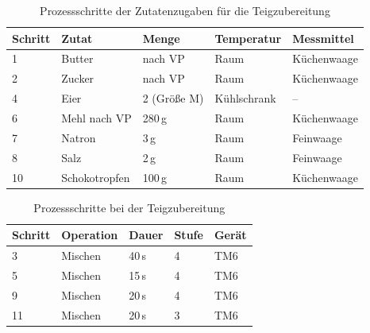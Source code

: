 \begin{table}
\centering
\caption{Prozessschritte der Zutatenzugaben für die Teigzubereitung}
\label{table:zubereitung_zugaben}
\begin{tabular}{|l|l|l|l|l|}
\hline
Schritt & Zutat               & Menge    & Temperatur  & Messmittel \\
\hline
1       & Butter              & nach VP     & Raum        & Küchenwaage \\
2       & Zucker              & nach VP     & Raum        & Küchenwaage \\
\hline
4       & Eier                & 2 (Größe M) & Kühlschrank & -- \\
\hline
6       & Mehl nach VP        & 280\,g      & Raum        & Küchenwaage \\
7       & Natron              & 3\,g        & Raum        & Feinwaage \\
8       & Salz                & 2\,g        & Raum        & Feinwaage \\
\hline
10      & Schokotropfen       & 100\,g      & Raum        & Küchenwaage \\
\hline
\end{tabular}
\end{table}

\begin{table}
\centering
\caption{Prozessschritte bei der Teigzubereitung}
\label{table:zubereitung_prozess}
\begin{tabular}{|l|l|l|l|l|}
\hline
Schritt & Operation & Dauer & Stufe & Gerät \\
\hline
3       & Mischen   & 40\,s & 4     & TM6 \\
5       & Mischen   & 15\,s & 4     & TM6 \\
9       & Mischen   & 20\,s & 4     & TM6 \\
11      & Mischen   & 20\,s & 3     & TM6 \\
\hline
\end{tabular}
\end{table}